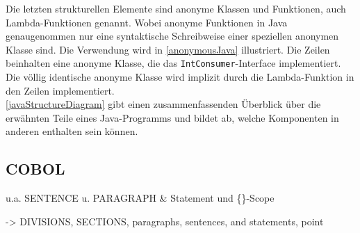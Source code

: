 Die letzten strukturellen Elemente sind anonyme Klassen und Funktionen, auch Lambda-Funktionen genannt. Wobei anonyme Funktionen in Java genaugenommen nur eine syntaktische Schreibweise einer speziellen anonymen Klasse sind. Die Verwendung wird in \autoref{anonymousJava} illustriert. Die Zeilen  beinhalten eine anonyme Klasse, die das \texttt{IntConsumer}-Interface implementiert. Die völlig identische  anonyme Klasse wird implizit durch die Lambda-Funktion in den Zeilen  implementiert.\\

\autoref{javaStructureDiagram} gibt einen zusammenfassenden Überblick über die erwähnten Teile eines Java-Programms und bildet ab, welche Komponenten in anderen enthalten sein können.\\

\subsection*{COBOL}

u.a. SENTENCE u. PARAGRAPH \& Statement und \{\}-Scope


-> DIVISIONS, SECTIONS, paragraphs, sentences, and statements, point